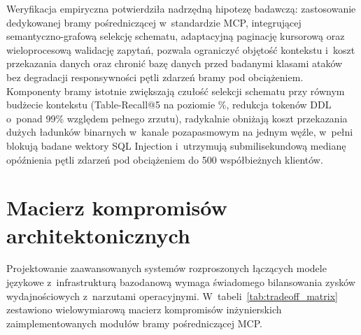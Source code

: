 Weryfikacja empiryczna potwierdziła nadrzędną hipotezę badawczą: zastosowanie dedykowanej bramy pośredniczącej w~standardzie MCP, integrującej semantyczno-grafową selekcję schematu, adaptacyjną paginację kursorową oraz wieloprocesową walidację zapytań, pozwala ograniczyć objętość kontekstu i~koszt przekazania danych oraz chronić bazę danych przed badanymi klasami ataków bez degradacji responsywności pętli zdarzeń bramy pod obciążeniem. Komponenty bramy istotnie zwiększają czułość selekcji schematu przy równym budżecie kontekstu (Table-Recall@5 na poziomie \wynRecallGraphFive\%, redukcja tokenów DDL o~ponad 99\% względem pełnego zrzutu), radykalnie obniżają koszt przekazania dużych ładunków binarnych w~kanale pozapasmowym na jednym węźle, w~pełni blokują badane wektory SQL Injection i~utrzymują submilisekundową medianę opóźnienia pętli zdarzeń pod obciążeniem do 500 współbieżnych klientów.


\section{Macierz kompromisów architektonicznych}
\label{sec:podsumowanie_tradeoffs}

Projektowanie zaawansowanych systemów rozproszonych łączących modele językowe z~infrastrukturą bazodanową wymaga świadomego bilansowania zysków wydajnościowych z~narzutami operacyjnymi. W~tabeli~\ref{tab:tradeoff_matrix} zestawiono wielowymiarową macierz kompromisów inżynierskich zaimplementowanych modułów bramy pośredniczącej MCP.

